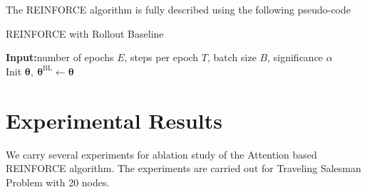 \documentclass{article}
\theoremstyle{definition}
\begin{document}
The REINFORCE algorithm is fully described using the following pseudo-code
\begin{algorithm}[H]
\SetAlgoLined
  \caption{REINFORCE with Rollout Baseline} \label{alg:reinforce_rollout}
  \textbf{Input:}number of epochs $E$, steps per epoch $T$, batch size $B$, significance $\alpha$\\
    Init $\bm{\theta},\ \bm{\theta}^{\text{BL}} \gets \bm{\theta}$\\
\end{algorithm}   





















\section{Experimental Results}
We carry several experiments for ablation study of the Attention based REINFORCE algorithm. The experiments are carried out for Traveling Salesman Problem with 20 nodes.\\
\end{document}
